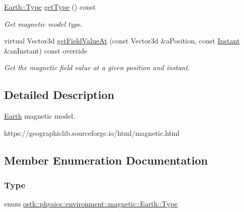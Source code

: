 \begin{DoxyCompactItemize}
\hyperlink{classostk_1_1physics_1_1environment_1_1magnetic_1_1_earth_a30a064d87b6fce338e76aebd3043b6b6}{Earth\+::\+Type} \hyperlink{classostk_1_1physics_1_1environment_1_1magnetic_1_1_earth_a20952c06c726e4f89f2f8184653ea74e}{get\+Type} () const
\begin{DoxyCompactList}\small\item\em Get magnetic model type. \end{DoxyCompactList}\item 
virtual Vector3d \hyperlink{classostk_1_1physics_1_1environment_1_1magnetic_1_1_earth_a2f39ff75c4a674b6720b27c2c6a0b930}{get\+Field\+Value\+At} (const Vector3d \&a\+Position, const \hyperlink{classostk_1_1physics_1_1time_1_1_instant}{Instant} \&an\+Instant) const override
\begin{DoxyCompactList}\small\item\em Get the magnetic field value at a given position and instant. \end{DoxyCompactList}\end{DoxyCompactItemize}


\subsection{Detailed Description}
\hyperlink{classostk_1_1physics_1_1environment_1_1magnetic_1_1_earth}{Earth} magnetic model. 

https\+://geographiclib.sourceforge.\+io/html/magnetic.html 

\subsection{Member Enumeration Documentation}
\mbox{\label{classostk_1_1physics_1_1environment_1_1magnetic_1_1_earth_a30a064d87b6fce338e76aebd3043b6b6}} 
\subsubsection{\texorpdfstring{Type}{Type}}
{\footnotesize\ttfamily enum \hyperlink{classostk_1_1physics_1_1environment_1_1magnetic_1_1_earth_a30a064d87b6fce338e76aebd3043b6b6}{ostk\+::physics\+::environment\+::magnetic\+::\+Earth\+::\+Type}\hspace{0.3cm}{\ttfamily [strong]}}

